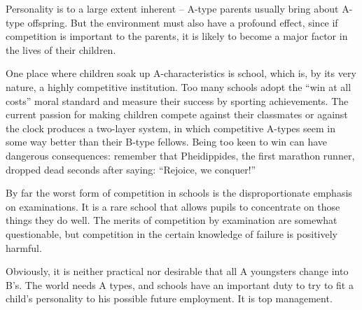 \documentclass[a4paper]{article}
\begin{document}
\par
Personality is to a large extent inherent -- A-type parents usually bring about A-type offspring. But the environment must also have a profound effect, since if competition is important to the parents, it is likely to become a major factor in the lives of their children.

\par
One place where children soak up A-characteristics is school, which is, by its very nature, a highly competitive institution. Too many schools adopt the “win at all costs” moral standard and measure their success by sporting achievements. The current passion for making children compete against their classmates or against the clock produces a two-layer system, in which competitive A-types seem in some way better than their B-type fellows. Being too keen to win can have dangerous consequences: remember that Pheidippides, the first marathon runner, dropped dead seconds after saying: “Rejoice, we conquer!”

\par
By far the worst form of competition in schools is the disproportionate emphasis on examinations. It is a rare school that allows pupils to concentrate on those things they do well. The merits of competition by examination are somewhat questionable, but competition in the certain knowledge of failure is positively harmful.

\par
Obviously, it is neither practical nor desirable that all A youngsters change into B’s. The world needs A types, and schools have an important duty to try to fit a child’s personality to his possible future employment. It is top management.
\end{document}
